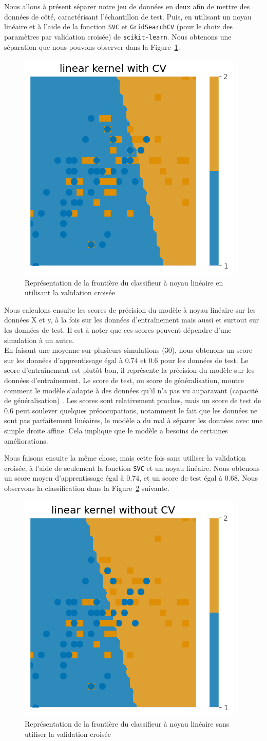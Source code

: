 \documentclass{article}
\begin{document}
Nous allons à présent séparer notre jeu de données en deux afin de mettre des données de côté, caractérisant l'échantillon de test. Puis, en utilisant un noyau linéaire et à l'aide de la fonction \texttt{SVC} et  \texttt{GridSearchCV} (pour le choix des paramètres par validation croisée) de  \texttt{scikit-learn}. Nous obtenons une séparation que nous pouvons observer dans la Figure~\ref{fig:q1_CV}.
\begin{figure}[H]
    \centering
    \includegraphics[width=.3\linewidth]{outputs/q1_with_CV.png}
    \caption{Représentation de la frontière du classifieur à noyau linéaire en utilisant la validation croisée}
    \label{fig:q1_CV}
\end{figure}
Nous calculons ensuite les scores de précision du modèle à noyau linéaire sur les données X et y, à la fois sur les données d'entraînement mais aussi et surtout sur les données de test. Il est à noter que ces scores peuvent dépendre d'une simulation à un autre.\\
En faisant une moyenne sur plusieurs simulations (30), nous obtenons un score sur les données d'apprentissage égal à $0.74$ et $0.6$ pour les données de test. Le score d'entraînement est plutôt bon, il représente la précision du modèle sur les données d'entraînement. Le score de test, ou score de généralisation, montre comment le modèle s'adapte à des données qu'il n'a pas vu auparavant (capacité de généralisation) . Les scores sont relativement proches, mais un score de test de $0.6$ peut soulever quelques préoccupations, notamment le fait que les données ne sont pas parfaitement linéaires, le modèle a du mal à séparer les données avec une simple droite affine. Cela implique que le modèle a besoins de certaines améliorations.

Nous faisons ensuite la même chose, mais cette fois sans utiliser la validation croisée, à l'aide de seulement la fonction \texttt{SVC} et un noyau linéaire. Nous obtenons un score moyen d'apprentissage égal à $0.74$, et un score de test égal à $0.68$. Nous observons la classification dans la Figure~\ref{fig:q1_noCV} suivante.
\begin{figure}[H]
    \centering
    \includegraphics[width=.3\linewidth]{outputs/q1_without_CV.png}
    \caption{Représentation de la frontière du classifieur à noyau linéaire sans utiliser la validation croisée}
    \label{fig:q1_noCV}
\end{figure}
\end{document}
